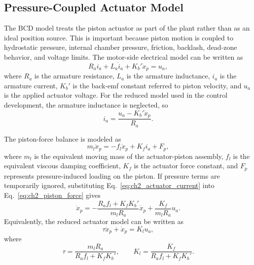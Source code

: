 \documentclass{uhcoethesis}
\begin{document}
\subsection{Pressure-Coupled Actuator Model}

The BCD model treats the piston actuator as part of the plant rather than as an ideal position source. This is important because piston motion is coupled to hydrostatic pressure, internal chamber pressure, friction, backlash, dead-zone behavior, and voltage limits. The motor-side electrical model can be written as
\begin{equation}
    R_a i_a + L_a \dot{i}_a + K_b'\dot{x}_p = u_a ,
    \label{eq:ch2_actuator_electrical}
\end{equation}
where $R_a$ is the armature resistance, $L_a$ is the armature inductance, $i_a$ is the armature current, $K_b'$ is the back-emf constant referred to piston velocity, and $u_a$ is the applied actuator voltage. For the reduced model used in the control development, the armature inductance is neglected, so
\begin{equation}
    i_a = \frac{u_a - K_b'\dot{x}_p}{R_a}.
    \label{eq:ch2_actuator_current}
\end{equation}

The piston-force balance is modeled as
\begin{equation}
    m_l\ddot{x}_p = -f_l\dot{x}_p + K_f i_a + F_p ,
    \label{eq:ch2_piston_force}
\end{equation}
where $m_l$ is the equivalent moving mass of the actuator-piston assembly, $f_l$ is the equivalent viscous damping coefficient, $K_f$ is the actuator force constant, and $F_p$ represents pressure-induced loading on the piston. If pressure terms are temporarily ignored, substituting Eq.~\eqref{eq:ch2_actuator_current} into Eq.~\eqref{eq:ch2_piston_force} gives
\begin{equation}
    \ddot{x}_p =
    -\frac{R_a f_l + K_f K_b'}{m_l R_a}\dot{x}_p
    + \frac{K_f}{m_l R_a}u_a .
    \label{eq:ch2_basic_actuator_model}
\end{equation}
Equivalently, the reduced actuator model can be written as
\begin{equation}
    \tau \ddot{x}_p + \dot{x}_p = K_l u_a ,
    \label{eq:ch2_tau_actuator}
\end{equation}
where
\begin{equation}
    \tau = \frac{m_l R_a}{R_a f_l + K_f K_b'}, \qquad
    K_l = \frac{K_f}{R_a f_l + K_f K_b'} .
    \label{eq:ch2_tau_kl}
\end{equation}
\end{document}
